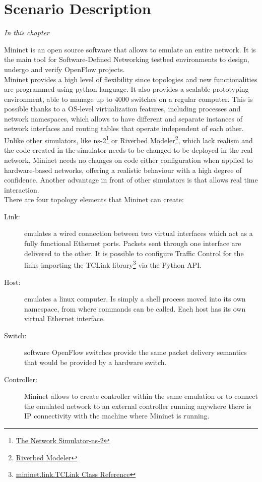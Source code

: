 \chapter{Scenario Description}
\label{ch:scenario}

\textit{ In this chapter  }



Mininet is an open source software that allows to emulate an entire network. It is the main tool for Software-Defined Networking testbed environments to design, undergo and verify OpenFlow projects.\\
 
Mininet provides a high level of flexibility since topologies and new functionalities are programmed using python language. It also provides a scalable prototyping environment, able to manage up to 4000 switches on a regular computer. This is possible thanks to a OS-level virtualization features, including processes and network namespaces, which allows to have different and separate instances of network interfaces and routing tables that operate independent of each other. \\

Unlike other simulators, like ns-2\footnote{\href{http://www.isi.edu/nsnam/ns/}{The Network Simulator-ns-2}} or Riverbed Modeler\footnote{\href{http://www.riverbed.com/products/performance-management-control/network-performance-management/network-simulation.html}{Riverbed Modeler}}, which lack realism and the code created in the simulator needs to be changed to be deployed in the real network, Mininet needs no changes on code either configuration when applied to hardware-based networks, offering a realistic behaviour with a high degree of confidence. Another advantage in front of other simulators is that allows real time interaction.\\ 

There are four topology elements that Mininet can create:\\
\begin{description}
\item[Link:] emulates a wired connection between two virtual interfaces which act as a fully functional Ethernet ports. Packets sent through one interface are delivered to the other. It is possible to configure Traffic Control for the links importing the TCLink library\footnote{\href{http://mininet.org/api/classmininet_1_1link_1_1TCLink.html}{mininet.link.TCLink Class Reference}} via the Python API.
\item[Host:] emulates a linux computer. Is simply a shell process moved into its own namespace, from where commands can be called. Each host has its own virtual Ethernet interface.
\item[Switch:] software OpenFlow switches provide the same packet delivery semantics that would be provided by a hardware switch.
\item[Controller:] Mininet allows to create  controller within the same emulation or to connect the emulated network to an external controller running anywhere there is IP connectivity with the machine where Mininet is running. 
\end{description}

